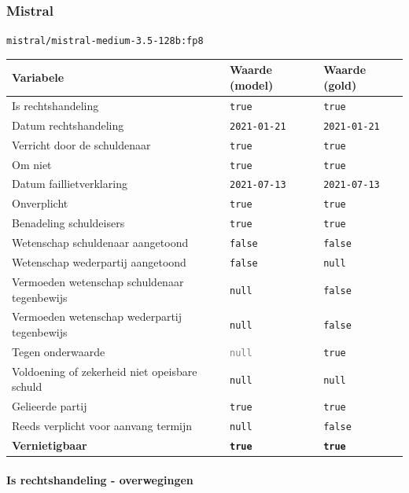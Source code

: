 \documentclass[
  dutch,
  a4paper,
]{article}
\begin{document}
\subsubsection{Mistral}\label{mistral-8}

\texttt{mistral/mistral-medium-3.5-128b:fp8}

\begin{center}
\small
\begin{tabular}{@{}p{7.4cm}p{2.6cm}p{2.6cm}@{}}
\toprule
Variabele & Waarde (model) & Waarde (gold) \\
\midrule
Is rechtshandeling & \texttt{true} & \texttt{true} \\
Datum rechtshandeling & \texttt{2021-01-21} & \texttt{2021-01-21} \\
Verricht door de schuldenaar & \texttt{true} & \texttt{true} \\
Om niet & \texttt{true} & \texttt{true} \\
Datum faillietverklaring & \texttt{2021-07-13} & \texttt{2021-07-13} \\
Onverplicht & \texttt{true} & \texttt{true} \\
Benadeling schuldeisers & \texttt{true} & \texttt{true} \\
Wetenschap schuldenaar aangetoond & \texttt{false} & \texttt{false} \\
Wetenschap wederpartij aangetoond & \texttt{false} & \texttt{null} \\
Vermoeden wetenschap schuldenaar tegenbewijs & \texttt{null} & \texttt{false} \\
Vermoeden wetenschap wederpartij tegenbewijs & \texttt{null} & \texttt{false} \\
Tegen onderwaarde & \textcolor{gray}{\texttt{null}} & \texttt{true} \\
Voldoening of zekerheid niet opeisbare schuld & \texttt{null} & \texttt{null} \\
Gelieerde partij & \texttt{true} & \texttt{true} \\
Reeds verplicht voor aanvang termijn & \texttt{null} & \texttt{false} \\
\textbf{Vernietigbaar} & \textbf{\texttt{true}} & \textbf{\texttt{true}} \\
\bottomrule
\end{tabular}
\end{center}

\paragraph{Is rechtshandeling - overwegingen}\label{is-rechtshandeling---overwegingen-24}
\end{document}
